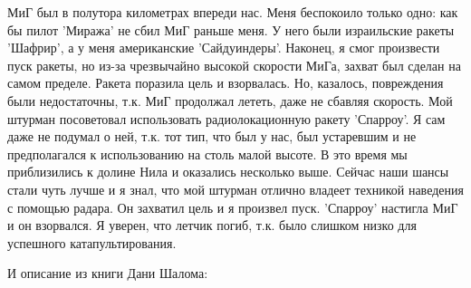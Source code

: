 \begin{textcitation}
	МиГ был в полутора километрах впереди нас. Меня беспокоило только одно: как бы пилот 'Миража' не сбил МиГ раньше меня. У него были израильские ракеты 'Шафрир', а у меня американские 'Сайдуиндеры'. Наконец, я смог произвести пуск ракеты, но из-за чрезвычайно высокой скорости МиГа, захват был сделан на самом пределе. Ракета поразила цель и взорвалась. Но, казалось, повреждения были недостаточны, т.к. МиГ продолжал лететь, даже не сбавляя скорость. Мой штурман посоветовал использовать радиолокационную ракету 'Спарроу'. Я сам даже не подумал о ней, т.к. тот тип, что был у нас, был устаревшим и не предполагался к использованию на столь малой высоте. В это время мы приблизились к долине Нила и оказались несколько выше. Сейчас наши шансы стали чуть лучше и я знал, что мой штурман отлично владеет техникой наведения с помощью радара. Он захватил цель и я произвел пуск. 'Спарроу' настигла МиГ и он взорвался. Я уверен, что летчик погиб, т.к. было слишком низко для успешного катапультирования.
\end{textcitation}

И описание из книги Дани Шалома:

